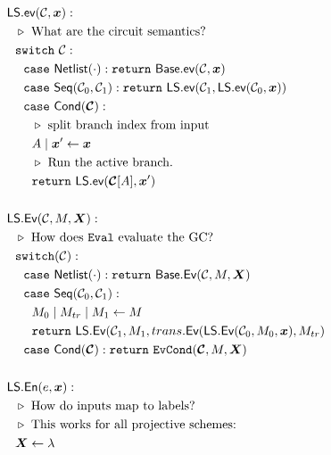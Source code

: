 \begin{figure}
  \begin{adjustwidth}{-0.1\textwidth}{-0.1\textwidth}
  \centering
  \begin{minipage}[t]{0.56\linewidth}
    \begin{align*}
      &\ourscheme.\gev(\cir, \cirinp):\\
      &~~\codecomment{What are the circuit semantics?}\\
      &~~\switch~\cir:\\
      &~~~~\ccase~\netlist(\cdot): \creturn~\underscheme.\gev(\cir, \cirinp)\\
      &~~~~\ccase~\sequential(\cir_0, \cir_1):
      \creturn~\ourscheme.\gev(\cir_1, \ourscheme.\gev(\cir_0,
      \cirinp))\\
      &~~~~\ccase~\conditional(\vec{\cir}):\\
      &~~~~~~\codecomment{split branch index from input}\\
      &~~~~~~\aid\mid\cirinp' \gets \cirinp\\
      &~~~~~~\codecomment{Run the active branch.}\\
      &~~~~~~\creturn~\ourscheme.\gev(\vec{\cir}[\aid], \cirinp')\\
      \\
      &\ourscheme.\gEv(\cir,\mat,\gcirinp):\\
      &~~\codecomment{How does \E evaluate the GC?}\\
      &~~\switch(\cir):\\
      &~~~~\ccase~\netlist(\cdot): \creturn~\underscheme.\gEv(\cir,\mat,\gcirinp)\\
      &~~~~\ccase~\sequential(\cir_0, \cir_1): \\
      &~~~~~~\mat_0\mid\mat_{tr}\mid\mat_1 \gets \mat\\
      &~~~~~~\creturn~\ourscheme.\gEv(\cir_1, \mat_1, \evtranslate(\ourscheme.\gEv(\cir_0, \mat_0, \cirinp), \mat_{tr})\\
      &~~~~\ccase~\conditional(\vec \cir): \creturn~\evcond(\vec \cir,
      \mat, \gcirinp)\\
      \\
      &\ourscheme.\gEn(e,\cirinp):\\
      &~~\codecomment{How do inputs map to labels?}\\
      &~~\codecomment{This works for all projective schemes:}\\
      &~~\gcirinp \gets \emptystring\\

\end{align*}
\end{minipage}
\end{adjustwidth}
\end{figure}
